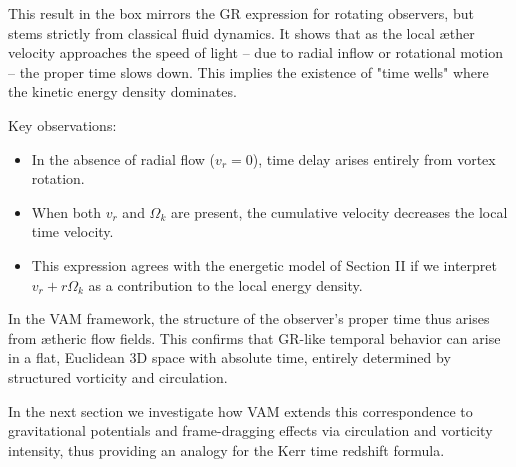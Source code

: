 This result in the box mirrors the GR expression for rotating observers, but stems strictly from classical fluid dynamics. It shows that as the local æther velocity approaches the speed of light – due to radial inflow or rotational motion – the proper time slows down. This implies the existence of "time wells" where the kinetic energy density dominates.

Key observations:

\begin{itemize}
 \item In the absence of radial flow (\(v_r = 0\)), time delay arises entirely from vortex rotation.
 \item When both \(v_r\) and \(\Omega_k\) are present, the cumulative velocity decreases the local time velocity.
 \item This expression agrees with the energetic model of Section II if we interpret \(v_r + r\Omega_k\) as a contribution to the local energy density.
\end{itemize}

In the VAM framework, the structure of the observer's proper time thus arises from ætheric flow fields. This confirms that GR-like temporal behavior can arise in a flat, Euclidean 3D space with absolute time, entirely determined by structured vorticity and circulation.

In the next section we investigate how VAM extends this correspondence to gravitational potentials and frame-dragging effects via circulation and vorticity intensity, thus providing an analogy for the Kerr time redshift formula.